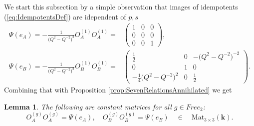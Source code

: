 \documentclass{amsart}
\newtheorem{lemma}[theorem]{Lemma}
\begin{document}
We start this subsection by a simple observation that images of idempotents (\ref{eq:IdempotentsDef}) are idependent of $p,s$
\begin{align*}
\Psi(e_A)=-\frac1{\big(Q^2-Q^{-2}\big)^2}O_A^{(1)}O_A^{(1)}=&\left(\begin{array}{ccc}
1&0&0\\
0&0&0\\
0&0&1
\end{array}\right),\\[0.5em]
\Psi(e_B)=-\frac1{\big(Q^2-Q^{-2}\big)^2}O_B^{(1)}O_B^{(1)}=&
    \left(\begin{array}{ccc}
    \frac{1}{2}&0&-\big(Q^2-Q^{-2}\big)^{-2}\\
    0&1&0\\
    -\frac14\big(Q^2-Q^{-2}\big)^2&0&\frac{1}{2}
    \end{array}\right).
\end{align*}
Combining that with Proposition \ref{prop:SevenRelationsAnnihilated} we get 
\begin{lemma}
The following are constant matrices for all $g\in Free_2$:
\begin{equation*}
O_A^{(g)}O_A^{(g)}=\Psi(e_A),\quad O_B^{(g)}O_B^{(g)}=\Psi(e_B)\quad \in\quad\mathrm{Mat}_{3\times 3}(\mathbf k).
\end{equation*}
\end{lemma}
\end{document}
